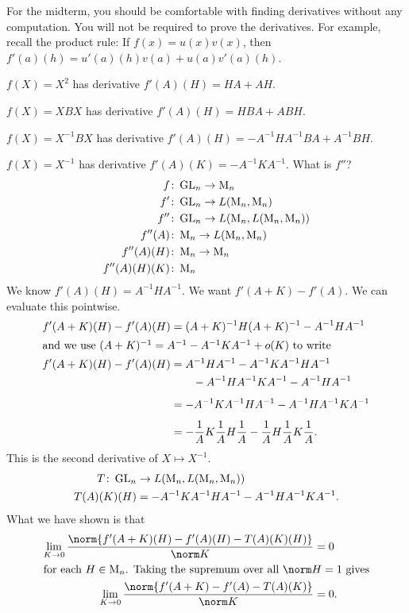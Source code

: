 For the midterm, you should be comfortable with finding derivatives without
any computation.
You will not be required to prove the derivatives.
For example, recall the product rule:
If $f(x) = u(x) v(x)$, then $f'(a)(h) = u'(a)(h) v(a) + u(a) v'(a)(h)$.
\begin{examples}
    \item $f(X) = X^2$ has derivative $f'(A)(H) = HA + AH$.
    \item $f(X) = XBX$ has derivative $f'(A)(H) = HBA + ABH$.
    \item $f(X) = X^{-1}BX$ has derivative
        $f'(A)(H) = -A^{-1}HA^{-1}BA + A^{-1}BH$.
    \item $f(X) = X^{-1}$ has derivative $f'(A)(K) = -A^{-1}KA^{-1}$.
        What is $f''$?
        \begin{align*}
            f&\colon \operatorname{GL}_n \to \operatorname{M}_n \\
            f'&\colon \operatorname{GL}_n \to L(\operatorname{M}_n, \operatorname{M}_n) \\
            f''&\colon \operatorname{GL}_n \to L(\operatorname{M}_n, L(\operatorname{M}_n, \operatorname{M}_n)) \\
            f''(A)&\colon \operatorname{M}_n \to L(\operatorname{M}_n, \operatorname{M}_n) \\
            f''(A)(H)&\colon \operatorname{M}_n \to \operatorname{M}_n \\
            f''(A)(H)(K)&\colon \operatorname{M}_n
        \end{align*}
        We know $f'(A)(H) = A^{-1}HA^{-1}$.
        We want $f'(A + K) - f'(A)$.
        We can evaluate this pointwise.
        \TODO[WHY???] %
        \begin{align*}
            f'(A+K)(H) - f'(A)(H)
                &= (A+K)^{-1}H(A+K)^{-1} - A^{-1}HA^{-1} \\
            \shortintertext{and we use
            $(A + K)^{-1} = A^{-1} - A^{-1}KA^{-1} + o(K)$ to write}
            f'(A+K)(H) - f'(A)(H)
                &= A^{-1} H A^{-1} - A^{-1}KA^{-1}HA^{-1} \\
                    &\qquad- A^{-1}HA^{-1}KA^{-1} - A^{-1}HA^{-1} \\[.4em]
                &= -A^{-1}KA^{-1}HA^{-1} -A^{-1}HA^{-1}KA^{-1} \\[.4em]
                &= -\frac1AK\frac1AH\frac1A -\frac1AH\frac1AK\frac1A.
        \end{align*}
        This is the second derivative of $X \mapsto X^{-1}$. \begin{align*}
            T\colon \operatorname{GL}_n &\to L(\operatorname{M}_n, L(\operatorname{M}_n, \operatorname{M}_n)) \\
            T(A)(K)(H) &= -A^{-1}KA^{-1}HA^{-1} - A^{-1}HA^{-1}KA^{-1}.
        \end{align*}
        What we have shown is that \begin{align*}
            \lim_{K \to 0} \frac{\norm{f'(A+K)(H) - f'(A)(H) - T(A)(K)(H)}}
                {\norm K} &= 0 \\
            \shortintertext{for each $H \in \M_n$.
            Taking the supremum over all $\norm H = 1$ gives}
            \lim_{K \to 0} \frac{\norm{f'(A+K) - f'(A) - T(A)(K)}}
                {\norm K} &= 0.
        \end{align*}
\end{examples}

